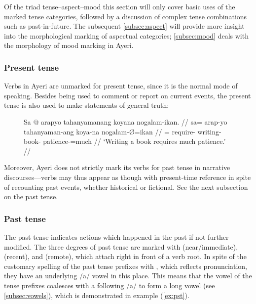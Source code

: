 Of the triad tense--aspect--mood this section will only cover basic uses of 
the marked tense categories, followed by a discussion of complex tense 
combinations such as past-in-future. The subsequent \autoref{subsec:aspect} 
will provide more insight into the morphological marking of aspectual 
categories; \autoref{subsec:mood} deals with the morphology of mood marking in 
Ayeri.

\subsubsection{Present tense}
Verbs in Ayeri are unmarked for present tense, since it is the normal mode of 
speaking. Besides being used to comment or report on current events, the 
present tense is also used to make statements of general truth:

\begin{figure}[h]
\ex\begingl
	\gla Sa @ arapyo tahanyamanang koyana nogalam-ikan. //
	\glb sa= arap-yo tahanyaman-ang koya-na nogalam-Ø=ikan //
	\glc \PatT{}= require-\TsgN{} writing-\Aarg{} book-\Gen{} 
		patience-\Top{}=much //
	\glft `Writing a book requires much patience.' //
\endgl\xe
\end{figure}

Moreover, Ayeri does not strictly mark its verbs for past tense in narrative 
discourses---verbs may thus appear as though with present-time reference in 
spite of recounting past events, whether historical or fictional. See the next 
subsection on the past tense.


\subsubsection{Past tense}
\label{subsubsec:past}
The past tense indicates actions which happened in the past if not further
modified. The three degrees of past tense are marked with 
(near/immediate),  (recent), and  (remote), which
attach right in front of a verb root. In spite of the customary spelling of the
past tense prefixes with , which reflects pronunciation, they have an
underlying /a/ vowel in this place. This means that the vowel of the tense
prefixes coalesces with a following /a/ to form a long vowel (see
\autoref{subsec:vowels}), which is demonstrated in example (\ref{ex:pst}).

